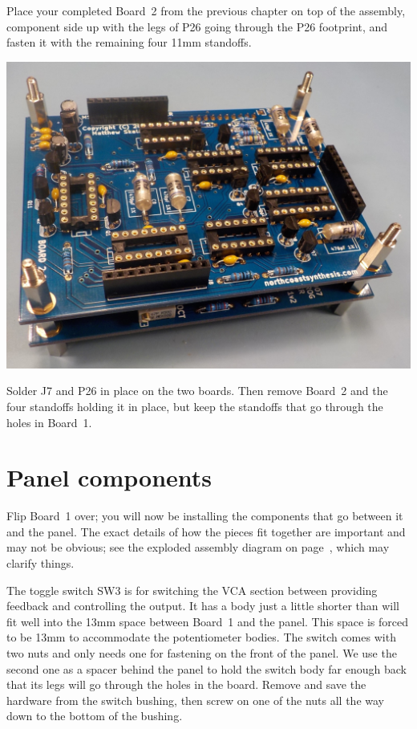 \pagebreak

Place your completed Board~2 from the previous chapter on top of the
assembly, component side up with the legs of P26 going through the P26
footprint, and fasten it with the remaining four 11mm standoffs.

\nopagebreak
\noindent\includegraphics[width=\linewidth]{board12-stack-3.jpg}

Solder J7 and P26 in place on the two boards.  Then remove Board~2 and the
four standoffs holding it in place, but keep the standoffs that go through
the holes in Board~1.

\section{Panel components}

Flip Board~1 over; you will now be installing the components that go between
it and the panel.  The exact details of how the pieces fit together are
important and may not be obvious; see the exploded assembly diagram on
page~\pageref{fig:exploded}, which may clarify things.

The toggle switch SW3 is for switching the VCA section between providing
feedback and controlling the output.  It has a body just a little shorter
than will fit well into the 13mm space between Board~1 and the panel.  This
space is forced to be 13mm to accommodate the potentiometer bodies.  The
switch comes with two nuts and only needs one for fastening on the front of
the panel.  We use the second one as a spacer behind the panel to hold the
switch body far enough back that its legs will go through the holes in the
board.  Remove and save the hardware from the switch bushing, then screw on
one of the nuts all the way down to the bottom of the bushing.

